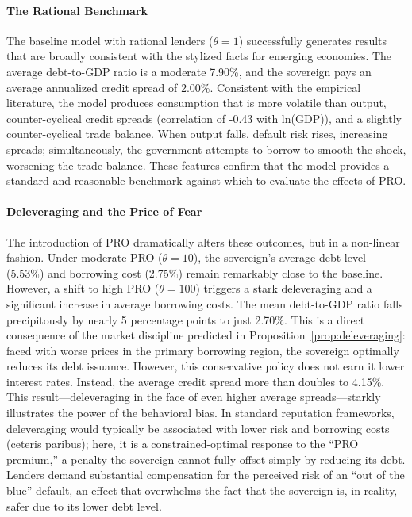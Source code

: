 \documentclass[12pt]{article}
\theoremstyle{plain}
\begin{document}
\paragraph{The Rational Benchmark}
The baseline model with rational lenders ($\theta=1$) successfully generates
results that are broadly consistent with the stylized facts for emerging
economies. The average debt-to-GDP ratio is a moderate 7.90\%, and the
sovereign pays an average annualized credit spread of 2.00\%. Consistent with
the empirical literature, the model produces consumption that is more volatile
than output, counter-cyclical credit spreads (correlation of -0.43 with
ln(GDP)), and a slightly counter-cyclical trade balance. When output falls,
default risk rises, increasing spreads; simultaneously, the government attempts
to borrow to smooth the shock, worsening the trade balance. These features
confirm that the model provides a standard and reasonable benchmark against
which to evaluate the effects of PRO.

\paragraph{Deleveraging and the Price of Fear}
The introduction of PRO dramatically alters these outcomes, but in a non-linear
fashion. Under moderate PRO ($\theta=10$), the sovereign's average debt level
(5.53\%) and borrowing cost (2.75\%) remain remarkably close to the baseline.
However, a shift to high PRO ($\theta=100$) triggers a stark deleveraging and a
significant increase in average borrowing costs. The mean debt-to-GDP ratio
falls precipitously by nearly 5 percentage points to just 2.70\%. This is a
direct consequence of the market discipline predicted in
Proposition~\ref{prop:deleveraging}: faced with worse prices in the primary
borrowing region, the sovereign optimally reduces its debt issuance. However,
this conservative policy does not earn it lower interest rates. Instead, the
average credit spread more than doubles to 4.15\%. This result---deleveraging
in the face of even higher average spreads—starkly illustrates the power of the
behavioral bias. In standard reputation frameworks, deleveraging would
typically be associated with lower risk and borrowing costs (ceteris paribus);
here, it is a constrained-optimal response to the ``PRO premium,'' a penalty
the sovereign cannot fully offset simply by reducing its debt. Lenders demand
substantial compensation for the perceived risk of an ``out of the blue''
default, an effect that overwhelms the fact that the sovereign is, in reality,
safer due to its lower debt level.
\end{document}
